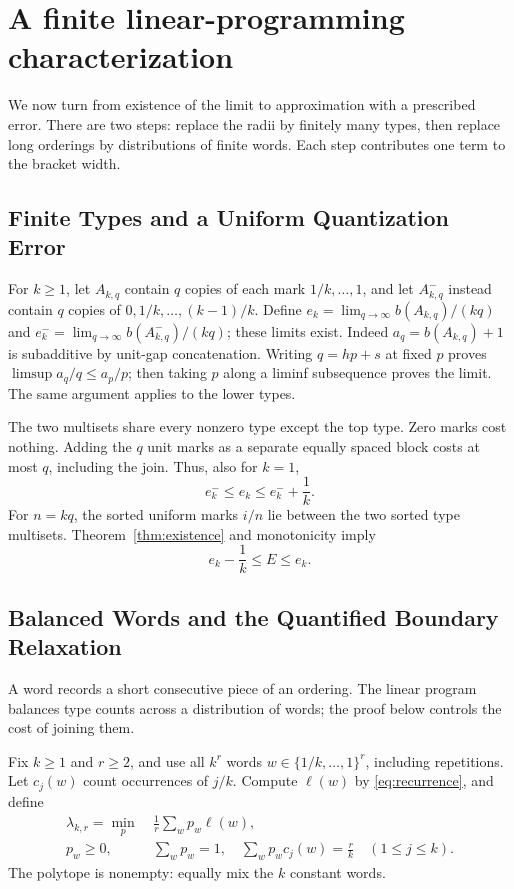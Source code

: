 \documentclass[11pt,letterpaper]{article}
\theoremstyle{definition}\newtheorem{definition}[theorem]{Definition}
\theoremstyle{remark}\newtheorem{remark}[theorem]{Remark}
\begin{document}
\section{A finite linear-programming characterization}\label{sec:lp}

We now turn from existence of the limit to approximation with a prescribed
error. There are two steps: replace the radii by finitely many types, then
replace long orderings by distributions of finite words. Each step contributes
one term to the bracket width.

\subsection{Finite Types and a Uniform Quantization Error}
For $k\ge1$, let $A_{k,q}$ contain $q$ copies of each mark
$1/k,\ldots,1$, and let $A^-_{k,q}$ instead contain $q$ copies of
$0,1/k,\ldots,(k-1)/k$. Define
$e_k=\lim_{q\to\infty}b(A_{k,q})/(kq)$ and
$e^-_k=\lim_{q\to\infty}b(A^-_{k,q})/(kq)$; these limits exist.
Indeed $a_q=b(A_{k,q})+1$ is subadditive by unit-gap concatenation.
Writing $q=hp+s$ at fixed $p$ proves
$\limsup a_q/q\le a_p/p$; then taking $p$ along a liminf subsequence
proves the limit. The same argument applies to the lower types.

The two multisets share every nonzero type except the top type. Zero marks
cost nothing. Adding the $q$ unit marks as a separate equally spaced
block costs at most $q$, including the join. Thus, also for $k=1$,
\[
 e^-_k\le e_k\le e^-_k+\frac1k.
\]
For $n=kq$, the sorted uniform marks $i/n$ lie between the two sorted
type multisets. Theorem~\ref{thm:existence} and monotonicity imply
\begin{equation}\label{eq:types}
 e_k-\frac1k\le E\le e_k.
\end{equation}

\subsection{Balanced Words and the Quantified Boundary Relaxation}
A word records a short consecutive piece of an ordering. The linear program
balances type counts across a distribution of words; the proof below controls
the cost of joining them.

Fix $k\ge1$ and $r\ge2$, and use all $k^r$ words
$w\in\{1/k,\ldots,1\}^r$, including repetitions. Let $c_j(w)$ count
occurrences of $j/k$. Compute $\ell(w)$ by \eqref{eq:recurrence}, and define
\begin{equation}\label{eq:lp}
\begin{split}
 \lambda_{k,r}=\min_p\ &\frac1r\sum_w p_w\ell(w),\\
 p_w\ge0,\quad &\sum_w p_w=1,\quad
 \sum_w p_wc_j(w)=\frac rk\quad(1\le j\le k).
\end{split}
\end{equation}
The polytope is nonempty: equally mix the $k$ constant words.
\end{document}
